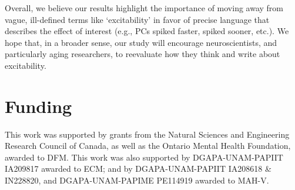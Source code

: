 \documentclass[12pt]{article}
\begin{document}
Overall, we believe our results highlight the importance of moving away from vague, ill-defined terms like `excitability' in favor of precise language that describes the effect of interest (e.g., PCs spiked faster, spiked sooner, etc.). We hope that, in a broader sense, our study will encourage neuroscientists, and particularly aging researchers, to reevaluate how they think and write about excitability.

\section*{Funding} 
This work was supported by grants from the Natural Sciences and Engineering Research Council of Canada, as well as the Ontario Mental Health Foundation, awarded to DFM. This work was also supported by DGAPA-UNAM-PAPIIT IA209817 awarded to ECM; and by DGAPA-UNAM-PAPIIT IA208618 \& IN228820, and DGAPA-UNAM-PAPIME PE114919 awarded to MAH-V.   
 
 
\begin{small}


\end{small}
\end{document}
